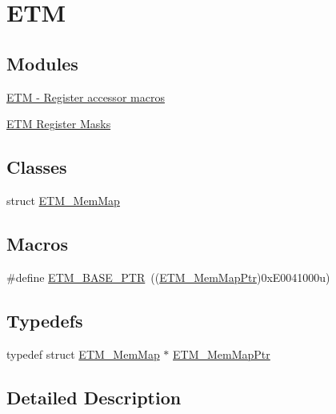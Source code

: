 \hypertarget{group___e_t_m___peripheral}{}\section{E\+TM}
\label{group___e_t_m___peripheral}
\subsection*{Modules}
\begin{DoxyCompactItemize}
\item 
\hyperlink{group___e_t_m___register___accessor___macros}{E\+T\+M -\/ Register accessor macros}
\item 
\hyperlink{group___e_t_m___register___masks}{E\+T\+M Register Masks}
\end{DoxyCompactItemize}
\subsection*{Classes}
\begin{DoxyCompactItemize}
\item 
struct \hyperlink{struct_e_t_m___mem_map}{E\+T\+M\+\_\+\+Mem\+Map}
\end{DoxyCompactItemize}
\subsection*{Macros}
\begin{DoxyCompactItemize}
\item 
\#define \hyperlink{group___e_t_m___peripheral_ga5f573e73b1defe379e4a2e666d2e47c7}{E\+T\+M\+\_\+\+B\+A\+S\+E\+\_\+\+P\+TR}~((\hyperlink{group___e_t_m___peripheral_ga88a18470aafe4a4922485f18a93c172d}{E\+T\+M\+\_\+\+Mem\+Map\+Ptr})0x\+E0041000u)
\end{DoxyCompactItemize}
\subsection*{Typedefs}
\begin{DoxyCompactItemize}
\item 
typedef struct \hyperlink{struct_e_t_m___mem_map}{E\+T\+M\+\_\+\+Mem\+Map} $\ast$ \hyperlink{group___e_t_m___peripheral_ga88a18470aafe4a4922485f18a93c172d}{E\+T\+M\+\_\+\+Mem\+Map\+Ptr}
\end{DoxyCompactItemize}


\subsection{Detailed Description}


